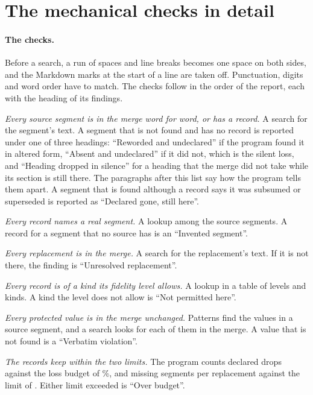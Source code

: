 \section{The mechanical checks in detail}
\label{sec:checks}

\paragraph{The checks.} Before a search, a run of spaces and line breaks becomes one space on both sides, and the Markdown marks at the start of a line are taken off. Punctuation, digits and word order have to match. The checks follow in the order of the report, each with the heading of its findings.
\begin{points}
\item \emph{Every source segment is in the merge word for word, or has a record.} A search for the segment's text. A segment that is not found and has no record is reported under one of three headings: ``Reworded and undeclared'' if the program found it in altered form, ``Absent and undeclared'' if it did not, which is the silent loss, and ``Heading dropped in silence'' for a heading that the merge did not take while its section is still there. The paragraphs after this list say how the program tells them apart. A segment that is found although a record says it was subsumed or superseded is reported as ``Declared gone, still here''.
\item \emph{Every record names a real segment.} A lookup among the source segments. A record for a segment that no source has is an ``Invented segment''.
\item \emph{Every replacement is in the merge.} A search for the replacement's text. If it is not there, the finding is ``Unresolved replacement''.
\item \emph{Every record is of a kind its fidelity level allows.} A lookup in a table of levels and kinds. A kind the level does not allow is ``Not permitted here''.
\item \emph{Every protected value is in the merge unchanged.} Patterns find the values in a source segment, and a search looks for each of them in the merge. A value that is not found is a ``Verbatim violation''.
\item \emph{The records keep within the two limits.} The program counts declared drops against the loss budget of \%, and missing segments per replacement against the limit of . Either limit exceeded is ``Over budget''.

\end{points}
